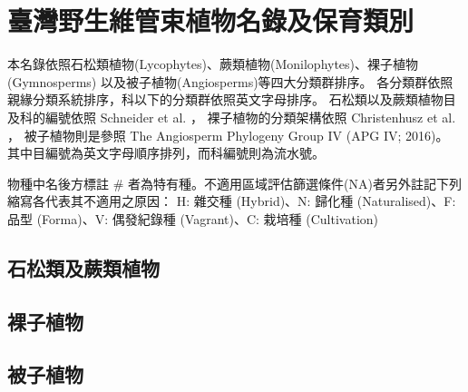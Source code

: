 \chapter{臺灣野生維管束植物名錄及保育類別}

\linespread{1.5}\selectfont
本名錄依照石松類植物(Lycophytes)、蕨類植物(Monilophytes)、裸子植物(Gymnosperms)
以及被子植物(Angiosperms)等四大分類群排序。
各分類群依照親緣分類系統排序，科以下的分類群依照英文字母排序。
石松類以及蕨類植物目及科的編號依照 Schneider et al. \citeyearpar{Schneider:2016hr}，
裸子植物的分類架構依照 Christenhusz et al. \citeyearpar{Christenhusz:2011wm}，
被子植物則是參照 The Angiosperm Phylogeny Group IV (APG IV; 2016)。
其中目編號為英文字母順序排列，而科編號則為流水號。

\noindent 物種中名後方標註 \# 者為特有種。不適用區域評估篩選條件(NA)者另外註記下列縮寫各代表其不適用之原因：
H: 雜交種 (Hybrid)、N: 歸化種 (Naturalised)、F: 品型 (Forma)、V: 偶發紀錄種 (Vagrant)、C: 栽培種 (Cultivation) \\

\linespread{1}\selectfont
\begin{multicols}{2}
\section{石松類及蕨類植物}

\section{裸子植物}

\section{被子植物}

\end{multicols}
